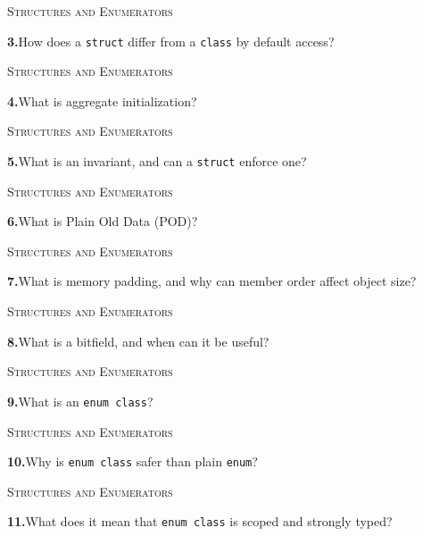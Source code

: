 \documentclass[11pt,a4paper]{article}
\newenvironment{questionblock}{%
  \begin{minipage}[t][0.455\textheight][t]{\textwidth}%
  \raggedright\small
}{%
  \vfill
  \end{minipage}%
}
\newcommand{\sectionlabel}[1]{\textsc{#1}\par\vspace{0.35em}}
\newcommand{\questionnumber}[1]{\textbf{#1.}\enspace}
\begin{document}
\vspace*{0.04\textheight}
\begin{questionblock}
\sectionlabel{Structures and Enumerators}
\questionnumber{3}How does a \verb|struct| differ from a \verb|class| by default access?\par
\end{questionblock}
\newpage
\begin{questionblock}
\sectionlabel{Structures and Enumerators}
\questionnumber{4}What is aggregate initialization?\par
\end{questionblock}
\vspace*{0.04\textheight}
\begin{questionblock}
\sectionlabel{Structures and Enumerators}
\questionnumber{5}What is an invariant, and can a \verb|struct| enforce one?\par
\end{questionblock}
\newpage
\begin{questionblock}
\sectionlabel{Structures and Enumerators}
\questionnumber{6}What is Plain Old Data (POD)?\par
\end{questionblock}
\vspace*{0.04\textheight}
\begin{questionblock}
\sectionlabel{Structures and Enumerators}
\questionnumber{7}What is memory padding, and why can member order affect object size?\par
\end{questionblock}
\newpage
\begin{questionblock}
\sectionlabel{Structures and Enumerators}
\questionnumber{8}What is a bitfield, and when can it be useful?\par
\end{questionblock}
\vspace*{0.04\textheight}
\begin{questionblock}
\sectionlabel{Structures and Enumerators}
\questionnumber{9}What is an \verb|enum class|?\par
\end{questionblock}
\newpage
\begin{questionblock}
\sectionlabel{Structures and Enumerators}
\questionnumber{10}Why is \verb|enum class| safer than plain \verb|enum|?\par
\end{questionblock}
\vspace*{0.04\textheight}
\begin{questionblock}
\sectionlabel{Structures and Enumerators}
\questionnumber{11}What does it mean that \verb|enum class| is scoped and strongly typed?\par
\end{questionblock}
\end{document}
